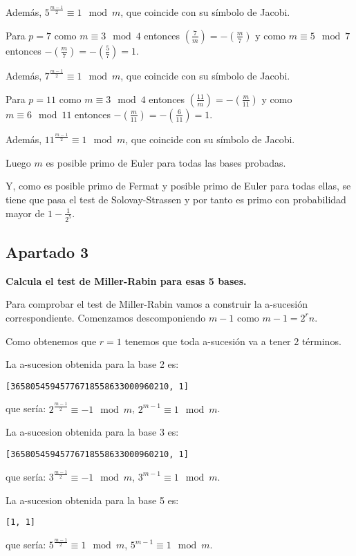 \documentclass[a4paper]{article}
\begin{document}
Además, $5^{\frac{m-1}{2}}\equiv 1\mod m$, que coincide con su símbolo de Jacobi.

Para $p=7$ como $m\equiv 3\mod 4$ entonces $\left( \frac{7}{m}\right)=-\left( \frac{m}{7}\right)$ y como $m\equiv 5\mod 7$ entonces $-\left( \frac{m}{7}\right)=-\left( \frac{5}{7}\right)=1$.

Además, $7^{\frac{m-1}{2}}\equiv 1\mod m$, que coincide con su símbolo de Jacobi.

Para $p=11$ como $m\equiv 3\mod 4$ entonces $\left( \frac{11}{m}\right)=-\left( \frac{m}{11}\right)$ y como $m\equiv 6\mod 11$ entonces $-\left( \frac{m}{11}\right)=-\left( \frac{6}{11}\right)=1$.

Además, $11^{\frac{m-1}{2}}\equiv 1\mod m$, que coincide con su símbolo de Jacobi.

Luego $m$ es posible primo de Euler para todas las bases probadas.

Y, como es posible primo de Fermat y posible primo de Euler para todas ellas, se tiene que pasa el test de Solovay-Strassen y por tanto es primo con probabilidad mayor de $1-\frac{1}{2^5}$.

\subsection{Apartado 3}

\textbf{Calcula el test de Miller-Rabin para esas 5 bases.}

Para comprobar el test de Miller-Rabin vamos a construir la a-sucesión correspondiente. Comenzamos descomponiendo $m-1$ como $m-1=2^rn$.

Como obtenemos que $r=1$ tenemos que toda a-sucesión va a tener 2 términos.

La a-sucesion obtenida para la base 2 es:
\begin{verbatim}
[36580545945776718558633000960210, 1]
\end{verbatim}
que sería: $2^{\frac{m-1}{2}}\equiv -1\mod m$, $2^{m-1}\equiv 1\mod m$.

La a-sucesion obtenida para la base 3 es:
\begin{verbatim}
[36580545945776718558633000960210, 1]
\end{verbatim}
que sería: $3^{\frac{m-1}{2}}\equiv -1\mod m$, $3^{m-1}\equiv 1\mod m$.

La a-sucesion obtenida para la base 5 es:
\begin{verbatim}
[1, 1]
\end{verbatim}
que sería: $5^{\frac{m-1}{2}}\equiv 1\mod m$, $5^{m-1}\equiv 1\mod m$.
\end{document}
